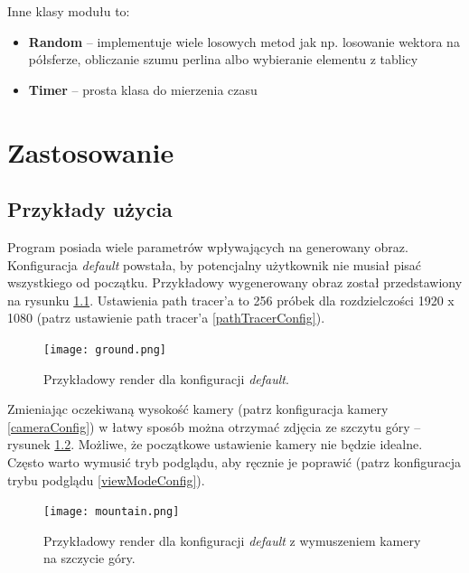 \documentclass[inz,shortabstract]{iithesis}
\begin{document}
            Inne klasy modułu to:
            \begin{itemize}
                \item \textbf{Random} -- implementuje wiele losowych metod jak np. losowanie wektora na półsferze, obliczanie szumu perlina albo wybieranie elementu z tablicy
                \item \textbf{Timer} -- prosta klasa do mierzenia czasu  
            \end{itemize}
            
\chapter{Zastosowanie}
    \section{Przykłady użycia}
        Program posiada wiele parametrów wpływających na generowany obraz. Konfiguracja \textit{default} powstała, by potencjalny użytkownik nie musiał pisać wszystkiego od początku. Przykładowy wygenerowany obraz został przedstawiony na rysunku \ref{fig:ground}. Ustawienia path tracer'a to 256 próbek dla rozdzielczości 1920 x 1080 (patrz ustawienie path tracer'a \ref{pathTracerConfig}).
        \begin{figure}[h]
            \texttt{[image: ground.png]}
            \caption{Przykładowy render dla konfiguracji \textit{default}.} 
            \label{fig:ground}
        \end{figure}
        
        Zmieniając oczekiwaną wysokość kamery (patrz konfiguracja kamery \ref{cameraConfig}) w łatwy sposób można otrzymać zdjęcia ze szczytu góry -- rysunek \ref{fig:mountain}. Możliwe, że początkowe ustawienie kamery nie będzie idealne. Często warto wymusić tryb podglądu, aby ręcznie je poprawić (patrz konfiguracja trybu podglądu \ref{viewModeConfig}). 
        \begin{figure}[h]
            \texttt{[image: mountain.png]}
            \caption{Przykładowy render dla konfiguracji \textit{default} z wymuszeniem kamery na szczycie góry.} 
            \label{fig:mountain}
        \end{figure}
        
\end{document}
